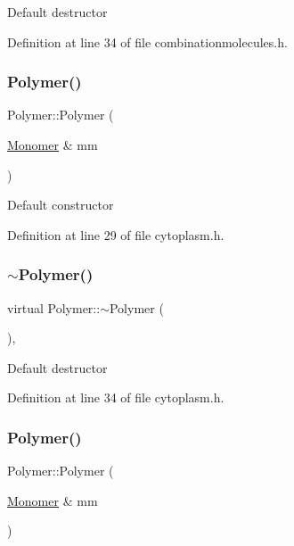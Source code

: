 Default destructor 

Definition at line 34 of file combinationmolecules.\+h.

\mbox{\label{class_polymer_ae77454a3908652e4df6a26b9cac509a5}} 
\subsubsection{\texorpdfstring{Polymer()}{Polymer()}\hspace{0.1cm}{\footnotesize\ttfamily [4/14]}}
{\footnotesize\ttfamily Polymer\+::\+Polymer (\begin{DoxyParamCaption}\item[{\mbox{\hyperlink{class_monomer}{Monomer}} \&}]{mm }\end{DoxyParamCaption})\hspace{0.3cm}{\ttfamily [inline]}}

Default constructor 

Definition at line 29 of file cytoplasm.\+h.

\mbox{\label{class_polymer_aac2b3983f375a5691c7d5ca1a79594d5}} 
\subsubsection{\texorpdfstring{$\sim$\+Polymer()}{~Polymer()}\hspace{0.1cm}{\footnotesize\ttfamily [4/11]}}
{\footnotesize\ttfamily virtual Polymer\+::$\sim$\+Polymer (\begin{DoxyParamCaption}{ }\end{DoxyParamCaption})\hspace{0.3cm}{\ttfamily [inline]}, {\ttfamily [virtual]}}

Default destructor 

Definition at line 34 of file cytoplasm.\+h.

\mbox{\label{class_polymer_ae77454a3908652e4df6a26b9cac509a5}} 
\subsubsection{\texorpdfstring{Polymer()}{Polymer()}\hspace{0.1cm}{\footnotesize\ttfamily [5/14]}}
{\footnotesize\ttfamily Polymer\+::\+Polymer (\begin{DoxyParamCaption}\item[{\mbox{\hyperlink{class_monomer}{Monomer}} \&}]{mm }\end{DoxyParamCaption})\hspace{0.3cm}{\ttfamily [inline]}}


